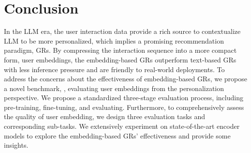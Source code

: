 \section{Conclusion}
In the LLM era, the user interaction data provide a rich source to contextualize LLM to be more personalized, which implies a promising recommendation paradigm, GRs. By compressing the interaction sequence into a more compact form, user embeddings, the embedding-based GRs outperform text-based GRs with less inference pressure and are friendly to real-world deployments.  
To address the concerns about the effectiveness of embedding-based GRs, we propose a novel benchmark, \name, evaluating user embeddings from the personalization perspective. We propose a standardized three-stage evaluation process, including pre-training, fine-tuning, and evaluating. Furthermore, to comprehensively assess the quality of user embedding, we design three evaluation tasks and corresponding sub-tasks. We extensively experiment on state-of-the-art encoder models to explore the embedding-based GRs' effectiveness and provide some insights. 


